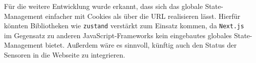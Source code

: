 \begin{inhalt}
Für die weitere Entwicklung wurde erkannt, dass sich das globale State-Management einfacher mit Cookies als über die URL realisieren lässt.  
Hierfür könnten Bibliotheken wie \texttt{zustand} verstärkt zum Einsatz kommen, da \texttt{Next.js} im Gegensatz zu anderen JavaScript-Frameworks kein eingebautes globales State-Management bietet.  
Außerdem wäre es sinnvoll, künftig auch den Status der Sensoren in die Webseite zu integrieren.





\end{inhalt}